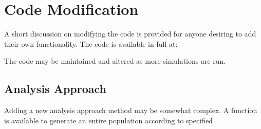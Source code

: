 \chapter{Code Modification}
\label{app:CM}

A short discussion on modifying the code is provided for anyone desiring to add their own functionality. The code is available in full at:

The code may be maintained and altered as more simulations are run.

\section{Analysis Approach}

Adding a new analysis approach method may be somewhat complex. A function is available to generate an entire population according to specified 
\endinput
